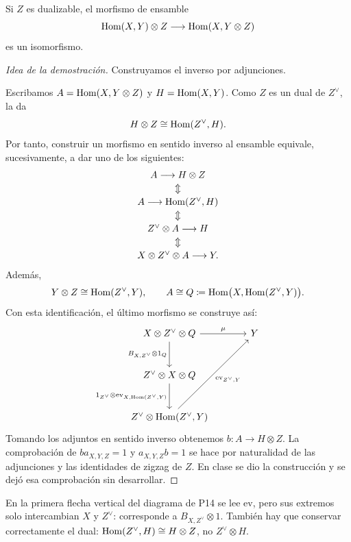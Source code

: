 \begin{prop}\label{prop:ensamble-iso}
Si $Z$ es dualizable, el morfismo de ensamble
\[
\operatorname{Hom}(X,Y)\otimes Z\longrightarrow\operatorname{Hom}(X,Y\otimes Z)
\]
es un isomorfismo.
\end{prop}
\begin{proof}[Idea de la demostración]
Construyamos el inverso por adjunciones.

Escribamos
$A=\operatorname{Hom}(X,Y\otimes Z)$ y $H=\operatorname{Hom}(X,Y)$.
Como $Z$ es un dual de $Z^\vee$, la  da
\[
H\otimes Z\cong\operatorname{Hom}(Z^\vee,H).
\]
Por tanto, construir un morfismo en sentido inverso al ensamble equivale, sucesivamente, a dar uno de los siguientes:
\[
\begin{array}{c}
A\longrightarrow H\otimes Z\\[2pt]
\Updownarrow\\[2pt]
A\longrightarrow\operatorname{Hom}(Z^\vee,H)\\[2pt]
\Updownarrow\\[2pt]
Z^\vee\otimes A\longrightarrow H\\[2pt]
\Updownarrow\\[2pt]
X\otimes Z^\vee\otimes A\longrightarrow Y .
\end{array}
\]
Además,
\[
Y\otimes Z\cong\operatorname{Hom}(Z^\vee,Y),
\qquad
A\cong Q\coloneqq\operatorname{Hom}\bigl(X,\operatorname{Hom}(Z^\vee,Y)\bigr).
\]
Con esta identificación, el último morfismo se construye así:
\[
\begin{tikzcd}[column sep=large,row sep=large]
X\otimes Z^\vee\otimes Q \arrow[r,"{\mu}"]
 \arrow[d,"{B_{X,Z^\vee}\otimes1_Q}"']
 &Y\\
Z^\vee\otimes X\otimes Q
 \arrow[d,"{1_{Z^\vee}\otimes\mathrm{ev}_{X,\ihom(Z^\vee,Y)}}"'] &\\
Z^\vee\otimes\ihom(Z^\vee,Y)
 \arrow[uur,"{\mathrm{ev}_{Z^\vee,Y}}"'] &
\end{tikzcd}
\]
Tomando los adjuntos en sentido inverso obtenemos
$b\colon A\to H\otimes Z$.
La comprobación de $ba_{X,Y,Z}=1$ y $a_{X,Y,Z}b=1$ se hace por naturalidad de las adjunciones y las identidades de zigzag de $Z$. En clase se dio la construcción y se dejó esa comprobación sin desarrollar.
\end{proof}

\begin{nota}
En la primera flecha vertical del diagrama de P14 se lee $\mathrm{ev}$, pero sus extremos solo intercambian $X$ y $Z^\vee$: corresponde a $B_{X,Z^\vee}\otimes1$. También hay que conservar correctamente el dual: $\operatorname{Hom}(Z^\vee,H)\cong H\otimes Z$, no $Z^\vee\otimes H$.
\end{nota}

